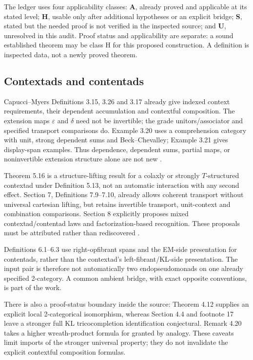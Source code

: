 \documentclass[11pt,a4paper]{article}
\begin{document}
The ledger uses four applicability classes: \textbf{A}, already proved and
applicable at its stated level; \textbf{H}, usable only after additional
hypotheses or an explicit bridge; \textbf{S}, stated but the needed proof is not
verified in the inspected source; and \textbf{U}, unresolved in this audit.
Proof status and applicability are separate: a sound established theorem may be
class H for this proposed construction. A definition is inspected data, not a
newly proved theorem.

\subsection{Contextads and contentads}

Capucci--Myers Definitions 3.15, 3.26 and 3.17 already give indexed context
requirements, their dependent accumulation and contextful composition. The
extension maps \(\varepsilon\) and \(\delta\) need not be invertible; the grade
unitors/associator and specified transport comparisons do. Example 3.20 uses a
comprehension category with unit, strong dependent sums and Beck--Chevalley;
Example 3.21 gives display-span examples. Thus dependence, dependent sums, partial
maps, or noninvertible extension structure alone are not new \cite{CM}.

Theorem 5.16 is a structure-lifting result for a colaxly or strongly
\(T\)-structured contextad under Definition 5.13, not an automatic interaction
with any second effect. Section 7, Definitions 7.9--7.10, already allows coherent
transport without universal cartesian lifting, but retains invertible transport,
unit-context and combination comparisons. Section 8 explicitly proposes mixed
contextad/contentad laws and factorization-based recognition. These proposals
must be attributed rather than rediscovered \cite{CM}.

Definitions 6.1--6.3 use right-opfibrant spans and the EM-side presentation for
contentads, rather than the contextad's left-fibrant/KL-side presentation. The
input pair is therefore not automatically two endopseudomonads on one already
specified 2-category. A common ambient bridge, with exact opposite conventions,
is part of the work.

There is also a proof-status boundary inside the source: Theorem 4.12 supplies an
explicit local 2-categorical isomorphism, whereas Section 4.4 and footnote 17
leave a stronger full KL tricocompletion identification conjectural. Remark
4.20 takes a higher wreath-product formula for granted by analogy. These caveats
limit imports of the stronger universal property; they do not invalidate the
explicit contextful composition formulas.
\end{document}
